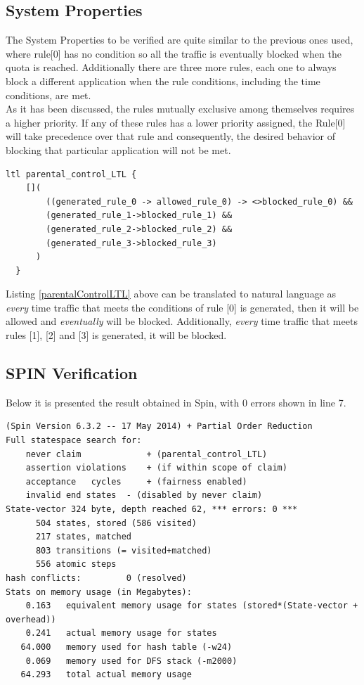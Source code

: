    
\subsection{System Properties}
\label{sec:mutualExclusion2}
\noindent The System Properties to be verified are quite similar to the previous ones used, where rule[0] has no condition so all the traffic is eventually blocked when the quota is reached. Additionally there are three more rules, each one to always block a different application when the rule conditions, including the time conditions, are met.\\

As it has been discussed, the rules mutually exclusive among themselves requires a higher priority. If any of these rules has a lower priority assigned, the Rule[0] will take precedence over that rule and consequently, the desired behavior of blocking that particular application will not be met. \\

\singlespacing
\begin{lstlisting}[caption=Parental-Control-Rules LTL,
  label=parentalControlLTL]
  ltl parental_control_LTL {
    []( 
        ((generated_rule_0 -> allowed_rule_0) -> <>blocked_rule_0) && 
        (generated_rule_1->blocked_rule_1) &&
        (generated_rule_2->blocked_rule_2) &&
        (generated_rule_3->blocked_rule_3)
      )
  }
\end{lstlisting}
\doublespacing

Listing \ref{parentalControlLTL} above can be translated to natural language as \emph{every} time traffic that meets the conditions of rule [0] is generated, then it will be allowed and \emph{eventually} will be blocked. Additionally, \emph{every} time traffic that meets rules [1], [2] and [3] is generated, it will be blocked. 

\subsection{SPIN Verification}
\noindent 
Below it is presented the result obtained in Spin, with 0 errors shown in line 7.

\singlespacing
\begin{lstlisting}[caption=Parental-Control-Rules Plan Verification,
  label=ParentalControlResult]
(Spin Version 6.3.2 -- 17 May 2014) + Partial Order Reduction
Full statespace search for:
	never claim         	+ (parental_control_LTL)
	assertion violations	+ (if within scope of claim)
	acceptance   cycles 	+ (fairness enabled)
	invalid end states	- (disabled by never claim)
State-vector 324 byte, depth reached 62, *** errors: 0 ***
      504 states, stored (586 visited)
      217 states, matched
      803 transitions (= visited+matched)
      556 atomic steps
hash conflicts:         0 (resolved)
Stats on memory usage (in Megabytes):
    0.163	equivalent memory usage for states (stored*(State-vector + overhead))
    0.241	actual memory usage for states
   64.000	memory used for hash table (-w24)
    0.069	memory used for DFS stack (-m2000)
   64.293	total actual memory usage
\end{lstlisting}
\doublespacing

